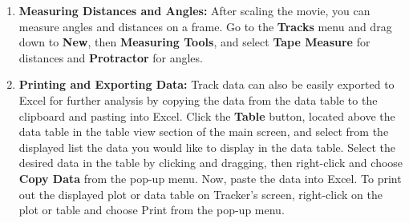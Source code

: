\begin{enumerate}
\item {\bf Measuring Distances and Angles:} After scaling the movie, you can measure angles and distances on
a frame. Go to the {\bf Tracks} menu and drag down to {\bf New}, then {\bf Measuring Tools}, and
select {\bf Tape Measure} for distances and {\bf Protractor} for angles.


\item {\bf Printing and Exporting Data:} Track data can also be easily exported to Excel for 
further analysis by copying the data from the 
data table to the clipboard and pasting into Excel. 
Click the {\bf Table} button, located above the data table in the table view section of the main screen, 
and select from the displayed list the data you would like to display in the data table. 
Select the desired data in the table by clicking and dragging, then right-click and choose {\bf Copy Data} 
from the pop-up menu. 
Now, paste the data into Excel.
To print out the displayed  plot or data table on Tracker's screen, 
right-click on the plot or table and choose Print from the pop-up menu.

\end{enumerate}

